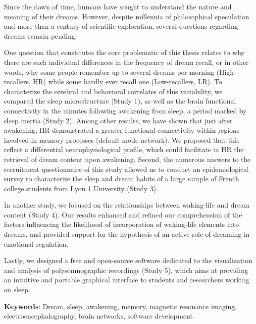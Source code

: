 \label{sec:abstract}
\vspace*{-10mm}

Since the dawn of time, humans have sought to understand the nature and meaning of their dreams. However, despite millennia of philosophical speculation and more than a century of scientific exploration, several questions regarding dreams remain pending.

One question that constitutes the core problematic of this thesis relates to why there are such individual differences in the frequency of dream recall, or in other words, why some people remember up to several dreams per morning (High-recallers, HR) while some hardly ever recall one (Low-recallers, LR). To characterize the cerebral and behavioral correlates of this variability, we compared the sleep microstructure (Study 1), as well as the brain functional connectivity in the minutes following awakening from sleep, a period marked by sleep inertia (Study 2). Among other results, we have shown that just after awakening, HR demonstrated a greater functional connectivity within regions involved in memory processes (default mode network). We proposed that this reflect a differential neurophysiological profile, which could facilitate in HR the retrieval of dream content upon awakening. Second, the numerous answers to the recruitment questionnaire of this study allowed us to conduct an epidemiological survey to characterize the sleep and dream habits of a large sample of French college students from Lyon 1 University (Study 3).

In another study, we focused on the relationships between waking-life and dream content (Study 4). Our results enhanced and refined our comprehension of the factors influencing the likelihood of incorporation of waking-life elements into dreams, and provided support for the hypothesis of an active role of dreaming in emotional regulation.

Lastly, we designed a free and open-source software dedicated to the visualization and analysis of polysomnographic recordings (Study 5), which aims at providing an intuitive and portable graphical interface to students and researchers working on sleep.

\textbf{Keywords}: Dream, sleep, awakening, memory, magnetic resonance imaging, electroencephalography, brain networks, software development

\cleardoublepage

\label{sec:résumé}
\vspace*{-10mm}

